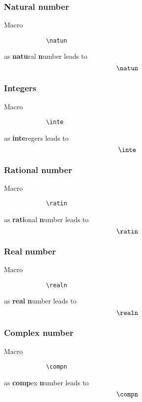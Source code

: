 \documentclass{article}
\begin{document}
		\subsubsection*{Natural number}
		Macro
		\begin{lstlisting}
			\natun
		\end{lstlisting}
		as \textbf{natu}ral \textbf{n}umber leads to
		\begin{equation*}
			\natun
		\end{equation*}
		
		\subsubsection*{Integers}
		Macro
		\begin{lstlisting}
			\inte
		\end{lstlisting}
		as \textbf{inte}regers leads to
		\begin{equation*}
			\inte
		\end{equation*}
		
		\subsubsection*{Rational number}
		Macro
		\begin{lstlisting}
			\ratin
		\end{lstlisting}
		as \textbf{rati}onal \textbf{n}umber leads to
		\begin{equation*}
			\ratin
		\end{equation*}
		
		\subsubsection*{Real number}
		Macro
		\begin{lstlisting}
			\realn
		\end{lstlisting}
		as \textbf{real} \textbf{n}umber leads to
		\begin{equation*}
			\realn
		\end{equation*}
		
		\subsubsection*{Complex number}
		Macro
		\begin{lstlisting}
			\compn
		\end{lstlisting}
		as \textbf{comp}ex \textbf{n}umber leads to
		\begin{equation*}
			\compn
		\end{equation*}
	
\end{document}
